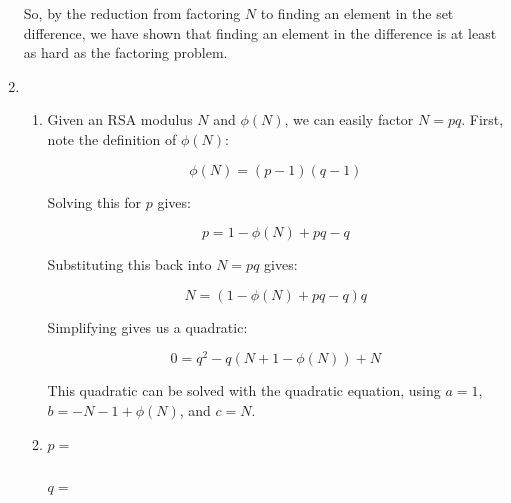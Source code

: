 \documentclass[12pt,letterpaper]{article}
\begin{document}
\begin{enumerate}
    So, by the reduction from factoring $N$ to finding an element in the set
    difference, we have shown that finding an element in the difference is at
    least as hard as the factoring problem.
  \item
    \begin{enumerate}
      \item Given an RSA modulus $N$ and $\phi(N)$, we can easily factor $N =
        pq$. First, note the definition of $\phi(N)$:

        $$\phi(N) = (p - 1)(q - 1)$$

        Solving this for $p$ gives:

        $$p = 1 - \phi(N) + pq - q$$

        Substituting this back into $N = pq$ gives:

        $$N = (1 - \phi(N) + pq - q)q$$

        Simplifying gives us a quadratic:

        $$0 = q^2 - q(N + 1 - \phi(N)) + N$$

        This quadratic can be solved with the quadratic equation, using $a = 1$,
        $b = - N - 1 + \phi(N)$, and $c = N$.

      \item $p =$\par
        \\
        $q =$\par
    \end{enumerate}
\end{enumerate}
\end{document}
